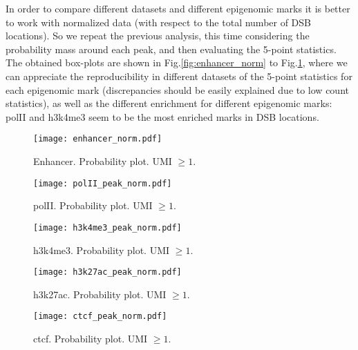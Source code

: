 \documentclass[11pt,a4paper]{article}
\begin{document}
\begin{figure}[hbtp]
\centering
\end{figure}


In order to compare different datasets and different epigenomic marks it is better to work with normalized data (with respect to the total number of DSB locations). So we repeat the previous analysis, this time considering the probability mass around each peak, and then evaluating the 5-point statistics. The obtained box-plots are shown in Fig.\ref{fig:enhancer_norm} to Fig.\ref{fig:ctcf_norm}, where we can appreciate the reproducibility in different datasets of the 5-point statistics for each epigenomic mark (discrepancies should be easily explained due to low count statistics), as well as the different enrichment for different epigenomic marks: polII and h3k4me3 seem to be the most enriched marks in DSB locations. 

\begin{figure}[hbtp]
\begin{minipage}[t]{0.45\textwidth}
\texttt{[image: enhancer\_norm.pdf]}
\caption{Enhancer. Probability plot. UMI $\geq 1$.}
\label{fig:enhancer_norm}
\end{minipage}
\hspace{\fill}
\begin{minipage}[t]{0.5\textwidth}
\texttt{[image: polII\_peak\_norm.pdf]}
\caption{polII. Probability plot. UMI $\geq 1$.}
\label{fig:polII_norm}
\end{minipage}
\vspace*{0.5cm} %
\begin{minipage}[t]{0.45\textwidth}
\texttt{[image: h3k4me3\_peak\_norm.pdf]}
\caption{h3k4me3. Probability plot. UMI $\geq 1$.}
\label{fig:h3k4me3_norm}
\end{minipage}
\hspace{\fill}
\begin{minipage}[t]{0.45\textwidth}
\texttt{[image: h3k27ac\_peak\_norm.pdf]}
\caption{h3k27ac. Probability plot. UMI $\geq 1$.}
\label{fig:h3k27ac_norm}
\end{minipage}
\vspace*{0.5cm} %
\begin{minipage}[t]{0.45\textwidth}
\texttt{[image: ctcf\_peak\_norm.pdf]}
\caption{ctcf. Probability plot. UMI $\geq 1$.}
\label{fig:ctcf_norm}
\end{minipage}
\end{figure}
\end{document}
